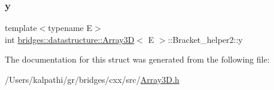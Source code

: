 \subsubsection{\texorpdfstring{y}{y}}
{\footnotesize\ttfamily template$<$typename E$>$ \\
int \mbox{\hyperlink{classbridges_1_1datastructure_1_1_array3_d}{bridges\+::datastructure\+::\+Array3D}}$<$ E $>$\+::Bracket\+\_\+helper2\+::y}



The documentation for this struct was generated from the following file\+:\begin{DoxyCompactItemize}
\item 
/\+Users/kalpathi/gr/bridges/cxx/src/\mbox{\hyperlink{_array3_d_8h}{Array3\+D.\+h}}\end{DoxyCompactItemize}
